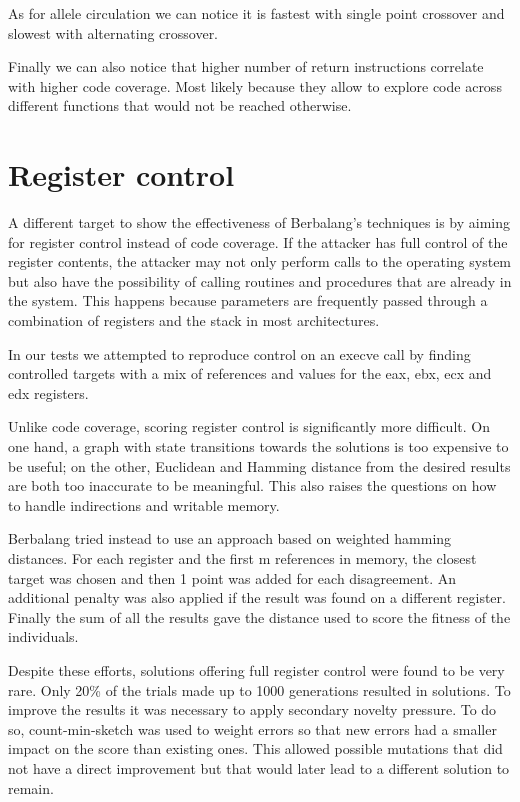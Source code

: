 \documentclass{article}
\begin{document}
As for allele circulation we can notice it is fastest with single point crossover and slowest with alternating crossover.

Finally we can also notice that higher number of return instructions correlate with higher code coverage. Most likely because they allow to explore code across different functions that would not be reached otherwise.

\section{Register control}
A different target to show the effectiveness of Berbalang's techniques is by aiming for register control instead of code coverage. If the attacker has full control of the register contents, the attacker may not only perform calls to the operating system but also have the possibility of calling routines and procedures that are already in the system. This happens because parameters are frequently passed through a combination of registers and the stack in most architectures.

In our tests we attempted to reproduce control on an execve call by finding controlled targets with a mix of references and values for the eax, ebx, ecx and edx registers.

Unlike code coverage, scoring register control is significantly more difficult. On one hand, a graph with state transitions towards the solutions is too expensive to be useful; on the other, Euclidean and Hamming distance from the desired results are both too inaccurate to be meaningful. This also raises the questions on how to handle indirections and writable memory.

Berbalang tried instead to use an approach based on weighted hamming distances. For each register and the first m references in memory, the closest target was chosen and then 1 point was added for each disagreement. An additional penalty was also applied if the result was found on a different register. Finally the sum of all the results gave the distance used to score the fitness of the individuals.

Despite these efforts, solutions offering full register control were found to be very rare. Only 20\% of the trials made up to 1000 generations resulted in solutions. To improve the results it was necessary to apply secondary novelty pressure. To do so, count-min-sketch was used to weight errors so that new errors had a smaller impact on the score than existing ones. This allowed possible mutations that did not have a direct improvement but that would later lead to a different solution to remain.
\end{document}

